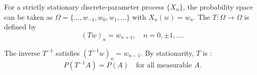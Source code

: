 For a strictly stationary discrete-parameter process $\{X_n\}$, the probability space can be taken as $\Omega = \{\ldots, w_{-1}, w_0, w_1, \ldots\}$ with $X_n(w) = w_n$. The  $T: \Omega \to \Omega$ is defined by
$$(Tw)_n = w_{n+1}, \quad n = 0, \pm 1, \ldots.$$

The inverse $T^{-1}$ satisfies $(T^{-1}w)_n = w_{n-1}$. By stationarity, $T$ is :
$$P(T^{-1}A) = P(A) \quad \text{for all measurable } A.$$
